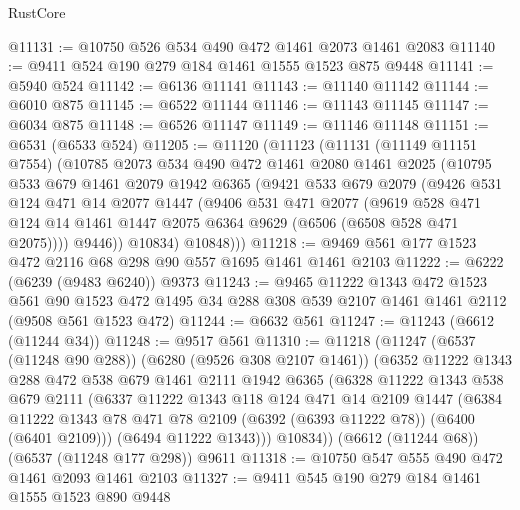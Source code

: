 \begin{lexlean}{RustCore}
\begin{coremodule}
@11131 := @10750 @526 @534 @490 @472 @1461 @2073 @1461 @2083
@11140 := @9411 @524 @190 @279 @184 @1461 @1555 @1523 @875 @9448
@11141 := @5940 @524
@11142 := @6136 @11141
@11143 := @11140 @11142
@11144 := @6010 @875
@11145 := @6522 @11144
@11146 := @11143 @11145
@11147 := @6034 @875
@11148 := @6526 @11147
@11149 := @11146 @11148
@11151 := @6531 (@6533 @524)
@11205 := @11120
    (@11123
      (@11131
        (@11149 @11151 @7554)
        (@10785
          @2073
          @534
          @490
          @472
          @1461
          @2080
          @1461
          @2025
          (@10795
            @533
            @679
            @1461
            @2079
            @1942
            @6365
            (@9421
              @533
              @679
              @2079
              (@9426
                @531
                @124
                @471
                @14
                @2077
                @1447
                (@9406
                  @531
                  @471
                  @2077
                  (@9619
                    @528
                    @471
                    @124
                    @14
                    @1461
                    @1447
                    @2075
                    @6364
                    @9629
                    (@6506 (@6508 @528 @471 @2075))))
                @9446))
            @10834)
          @10848)))
@11218 := @9469 @561 @177 @1523 @472 @2116 @68 @298 @90 @557 @1695 @1461 @1461 @2103
@11222 := @6222 (@6239 (@9483 @6240)) @9373
@11243 := @9465
    @11222
    @1343
    @472
    @1523
    @561
    @90
    @1523
    @472
    @1495
    @34
    @288
    @308
    @539
    @2107
    @1461
    @1461
    @2112
    (@9508 @561 @1523 @472)
@11244 := @6632 @561
@11247 := @11243 (@6612 (@11244 @34))
@11248 := @9517 @561
@11310 := @11218
    (@11247
      (@6537 (@11248 @90 @288))
      (@6280 (@9526 @308 @2107 @1461))
      (@6352
        @11222
        @1343
        @288
        @472
        @538
        @679
        @1461
        @2111
        @1942
        @6365
        (@6328
          @11222
          @1343
          @538
          @679
          @2111
          (@6337
            @11222
            @1343
            @118
            @124
            @471
            @14
            @2109
            @1447
            (@6384 @11222 @1343 @78 @471 @78 @2109 (@6392 (@6393 @11222 @78)) (@6400 (@6401 @2109)))
            (@6494 @11222 @1343)))
        @10834))
    (@6612 (@11244 @68))
    (@6537 (@11248 @177 @298))
    @9611
@11318 := @10750 @547 @555 @490 @472 @1461 @2093 @1461 @2103
@11327 := @9411 @545 @190 @279 @184 @1461 @1555 @1523 @890 @9448

\end{coremodule}
\end{lexlean}
